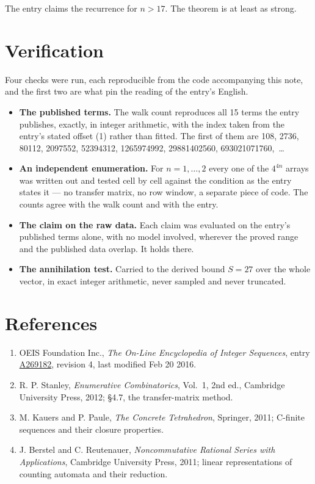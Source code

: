 \documentclass[11pt]{article}
\theoremstyle{definition}
\begin{document}
The entry claims the recurrence for $n > 17$. The theorem is at least as strong.

\section{Verification}

Four checks were run, each reproducible from the code accompanying this note, and the first two are what pin the reading of the entry's English.

\begin{itemize}

\item {\bfseries The published terms.} The walk count reproduces all 15 terms the entry publishes, exactly, in integer arithmetic, with the index taken from the entry's stated offset (1) rather than fitted. The first of them are 108, 2736, 80112, 2097552, 52394312, 1265974992, 29881402560, 693021071760,~\dots

\item {\bfseries An independent enumeration.} For $n = 1,\dots,2$ every one of the $4^{4n}$ arrays was written out and tested cell by cell against the condition as the entry states it --- no transfer matrix, no row window, a separate piece of code. The counts agree with the walk count and with the entry.

\item {\bfseries The claim on the raw data.} Each claim was evaluated on the entry's published terms alone, with no model involved, wherever the proved range and the published data overlap. It holds there.

\item {\bfseries The annihilation test.} Carried to the derived bound $S = 27$ over the whole vector, in exact integer arithmetic, never sampled and never truncated.

\end{itemize}

\section{References}

\begin{enumerate}

\item OEIS Foundation Inc., \emph{The On-Line Encyclopedia of Integer Sequences}, entry \href{https://oeis.org/A269182}{A269182}, revision 4, last modified Feb 20 2016.

\item R. P. Stanley, \emph{Enumerative Combinatorics}, Vol.~1, 2nd ed., Cambridge University Press, 2012; \S4.7, the transfer-matrix method.

\item M. Kauers and P. Paule, \emph{The Concrete Tetrahedron}, Springer, 2011; C-finite sequences and their closure properties.

\item J. Berstel and C. Reutenauer, \emph{Noncommutative Rational Series with Applications}, Cambridge University Press, 2011; linear representations of counting automata and their reduction.

\end{enumerate}
\end{document}
